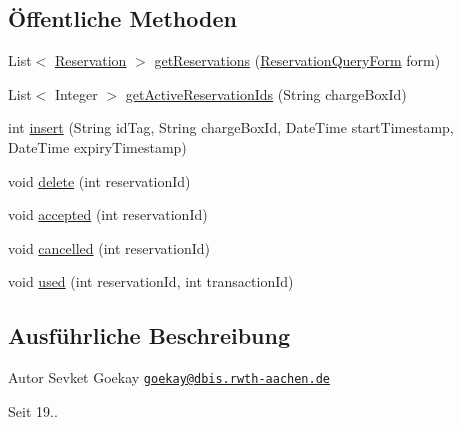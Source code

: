 \subsection*{Öffentliche Methoden}
\begin{DoxyCompactItemize}
\item 
List$<$ \hyperlink{classde_1_1rwth_1_1idsg_1_1steve_1_1repository_1_1dto_1_1_reservation}{Reservation} $>$ \hyperlink{interfacede_1_1rwth_1_1idsg_1_1steve_1_1repository_1_1_reservation_repository_ab80103ca7c1c6511e6b05246e7fcfbbb}{get\-Reservations} (\hyperlink{classde_1_1rwth_1_1idsg_1_1steve_1_1web_1_1dto_1_1_reservation_query_form}{Reservation\-Query\-Form} form)
\item 
List$<$ Integer $>$ \hyperlink{interfacede_1_1rwth_1_1idsg_1_1steve_1_1repository_1_1_reservation_repository_aefb53c3222e0d5f36e3aa7ac3a91b40c}{get\-Active\-Reservation\-Ids} (String charge\-Box\-Id)
\item 
int \hyperlink{interfacede_1_1rwth_1_1idsg_1_1steve_1_1repository_1_1_reservation_repository_aba723f89f7144b70a16335df5c57f4ea}{insert} (String id\-Tag, String charge\-Box\-Id, Date\-Time start\-Timestamp, Date\-Time expiry\-Timestamp)
\item 
void \hyperlink{interfacede_1_1rwth_1_1idsg_1_1steve_1_1repository_1_1_reservation_repository_a269c1973292847a6485237b4449a5f5c}{delete} (int reservation\-Id)
\item 
void \hyperlink{interfacede_1_1rwth_1_1idsg_1_1steve_1_1repository_1_1_reservation_repository_a839cd195bc1fa9893a32ac760b3353b0}{accepted} (int reservation\-Id)
\item 
void \hyperlink{interfacede_1_1rwth_1_1idsg_1_1steve_1_1repository_1_1_reservation_repository_a25403a1b68112eba0b41633addfa98ca}{cancelled} (int reservation\-Id)
\item 
void \hyperlink{interfacede_1_1rwth_1_1idsg_1_1steve_1_1repository_1_1_reservation_repository_a0e4c6205a4b4e61d9076401a36483d4e}{used} (int reservation\-Id, int transaction\-Id)
\end{DoxyCompactItemize}


\subsection{Ausführliche Beschreibung}
\begin{DoxyAuthor}{Autor}
Sevket Goekay \href{mailto:goekay@dbis.rwth-aachen.de}{\tt goekay@dbis.\-rwth-\/aachen.\-de} 
\end{DoxyAuthor}
\begin{DoxySince}{Seit}
19.. 
\end{DoxySince}


